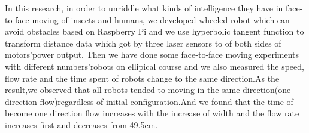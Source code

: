 In this research, in order to unriddle what kinds of intelligence they have in face-to-face moving of insects and humans, we developed wheeled robot which can avoid obstacles based on Raspberry Pi and we use hyperbolic tangent function to transform distance data which got by three laser sensors to of both sides of motors'power output. Then we have done some face-to-face moving experiments with different numbers'robots on ellipical course and we also measured the speed, flow rate and the time spent of robots change to the same direction.As the result,we observed that all robots tended to moving in the same direction(one direction flow)regardless of initial configuration.And we found that the time of become one direction flow increases with the increase of width and the flow rate increases first and decreases from 49.5cm.

